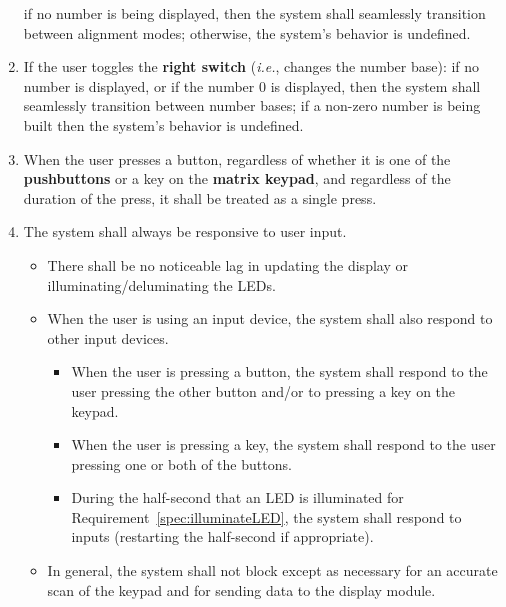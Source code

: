 \begin{enumerate}
        if no number is being displayed, then the system shall seamlessly transition between alignment modes;
        otherwise, the system's behavior is undefined.
    \item If the user toggles the \textbf{right switch} (\textit{i.e.}, changes the number base):
        if no number is displayed, or if the number 0 is displayed, then the system shall seamlessly transition between number bases;
        if a non-zero number is being built then the system's behavior is undefined.
    \item \label{spec:singleKeypress} When the user presses a button, regardless of whether it is one of the \textbf{pushbuttons} or a key on the \textbf{matrix keypad}, and regardless of the duration of the press, it shall be treated as a single press.
    \item \label{spec:responsive} The system shall always be responsive to user input.
        \begin{itemize}
            \item There shall be no noticeable lag in updating the display or illuminating/deluminating the LEDs.
            \item When the user is using an input device, the system shall also respond to other input devices.
                \begin{itemize}
                    \item When the user is pressing a button, the system shall respond to the user pressing the other button and/or to pressing a key on the keypad.
                    \item When the user is pressing a key, the system shall respond to the user pressing one or both of the buttons.
                    \item During the half-second that an LED is illuminated for Requirement~\ref{spec:illuminateLED}, the system shall respond to inputs (restarting the half-second if appropriate).
                \end{itemize}
            \item In general, the system shall not block except as necessary for an accurate scan of the keypad and for sending data to the display module.
        \end{itemize}

\end{enumerate}
